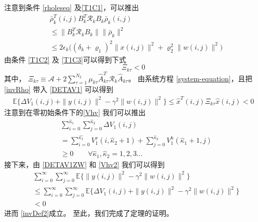 	注意到条件 \eqref{rholeseq} 及\eqref{T1C1}，可以推出
	\begin{equation}\label{invRho}
	\begin{split}
	&\bar{\rho}^{T}_{k}(i,j)B^{T}_{k}\mathcal{R}_{k}B_{k}\bar{\rho}_{k}(i,j)\\
	&\leq \|B^{T}_{k}\mathcal{R}_{k}B_{k}\|\|\bar{\rho}_{k}\|^{2} \\
	&\leq 2\epsilon_{k}\big((\delta_{k}+\varrho_{1})^{2}\|x(i,j)\|^{2}+\varrho_{2}^{2}\|w(i,j)\|^{2} \big)
	\end{split}
	\end{equation} 
	由条件 \eqref{T1C2} 及 \eqref{T1C3}可以得到下式
	\begin{equation}\label{T1P4}
	\mathcal{\varXi}_{k\tau }<0
	\end{equation}	
	其中， $\mathcal{\varXi}_{k\tau } \equiv \mathcal{A} +2\sum_{\tau =1}^{N_{2}}\mu_{k\tau }\hat{A}^{T}_{k\tau }\mathcal{R}_{k}\hat{A}_{k\tau }$。
	由系统方程 \eqref{system-equation}，且把\eqref{invRho} 带入 \eqref{DETAV1} 可以得到
	\begin{equation}\label{DETAV1ZW}
	\begin{split}
	\mathbb{E}\{\varDelta V_{1}(i,j)+\|y(i,j)\|^{2}-\gamma^{2}\|w(i,j)\|^{2}  \} \leq \hat{x}^{T}(i,j)\mathcal{\varXi}_{k\tau } \hat{x}(i,j)<0
	\end{split}
	\end{equation}
	注意到在零初始条件下的\eqref{Vhv} 我们可以推出
	\begin{equation} \label{Vhv2}
	\begin{split}
	&\sum_{i=0}^{\hat{\kappa}_{1}}\sum_{j=0}^{\hat{\kappa}_{2}}  \varDelta V_{1}(i,j)\\
	&=\sum_{i=0}^{\hat{\kappa_{1}}}V^{v}_{1}(i,\hat{\kappa}_{2}+1) + \sum_{j=0}^{\hat{\kappa}_{2}}V^{h}_{1}(\hat{\kappa}_{1}+1,j) \\
	&\geq 0 \qquad \forall \hat{\kappa}_{1},\hat{\kappa}_{2} = 1,2,3...
	\end{split}
	\end{equation}
	接下来，由 \eqref{DETAV1ZW} 和 \eqref{Vhv2} 我们可以得到 
	\begin{equation}\label{DETAV1ZW2}
	\begin{split}
	&\sum_{i=0}^{\infty}\sum_{j=0}^{\infty}  \mathbb{E}\{\|y(i,j)\|^{2}-\gamma^{2}\|w(i,j)\|^{2}  \}\\
	&\leq \sum_{i=0}^{\infty}\sum_{j=0}^{\infty}  \mathbb{E}\{\varDelta V_{1}(i,j)+\|y(i,j)\|^{2}-\gamma^{2}\|w(i,j)\|^{2}  \}  \\
	&< 0
	\end{split}
	\end{equation}
	进而 \eqref{invDef2}成立。 至此，我们完成了定理的证明。
	
